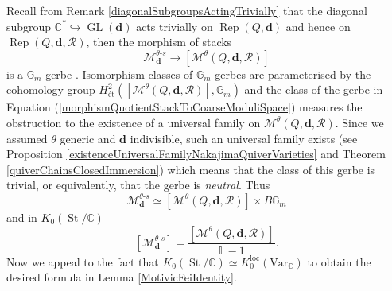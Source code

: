 \documentclass{amsart}
\theoremstyle{plain}
\numberwithin{equation}{section}
\theoremstyle{definition}
\theoremstyle{remark}
\begin{document}
	Recall from Remark \ref{diagonalSubgroupsActingTrivially} that the diagonal subgroup $\mathbb{C}^*\hookrightarrow\operatorname{GL}(\mathbf{d})$ acts trivially on $\operatorname{Rep}(Q,\mathbf{d})$ and hence on $\operatorname{Rep}(Q,\mathbf{\mathbf{d}},\mathcal{R})$, then the morphism of stacks
	\begin{equation}\label{morphismQuotientStackToCoarseModuliSpace}
			\mathscr{M}_{\mathbf{d}}^{\theta\text{-}s}\to [\mathcal{M}^{\theta}(Q,\mathbf{d},\mathcal{R})]
	\end{equation}
	is a $\mathbb{G}_m$-gerbe \cite[p. 1288]{HoskinsSchaffhauserRationalPoints}.  Isomorphism classes of $\mathbb{G}_m$-gerbes are parameterised by the cohomology group $H^2_{\text{ét}}([\mathcal{M}^{\theta}(Q,\mathbf{d},\mathcal{R})],\mathbb{G}_m)$ \cite[Proposition 4.1]{HoskinsSchaffhauserRationalPoints} and the class of the gerbe in Equation (\ref{morphismQuotientStackToCoarseModuliSpace}) measures the obstruction to the existence of a universal family on $\mathcal{M}^{\theta}(Q,\mathbf{d},\mathcal{R})$. Since we assumed $\theta$ generic and $\mathbf{d}$ indivisible, such an universal family exists (see Proposition \ref{existenceUniversalFamilyNakajimaQuiverVarieties} and Theorem \ref{quiverChainsClosedImmersion}) which means that the class of this gerbe is trivial, or equivalently, that the gerbe is \emph{neutral}. Thus
	$$
	\mathscr{M}^{\theta\text{-}s}_\mathbf{d}\simeq [\mathcal{M}^{\theta}(Q,\mathbf{d},\mathcal{R})]\times B\mathbb{G}_m
	$$
	and in $K_0(\operatorname{St}/\mathbb{C})$
	$$
	[\mathscr{M}^{\theta\text{-}s}_{\mathbf{d}}]=\frac{[\mathcal{M}^\theta(Q,\mathbf{d},\mathcal{R})]}{\mathbb{L}-1}.
	$$
	Now we appeal to the fact that $K_0(\operatorname{St}/\mathbb{C})\simeq K_0^{\text{loc}}(\text{Var}_\mathbb{C})$ \cite[Lemma 3.9]{BridgelandIntroMotivicHallAlgebras} to obtain the desired formula in Lemma \ref{MotivicFeiIdentity}.
	\nocite{*}
	
	
	
	
	
\end{document}
